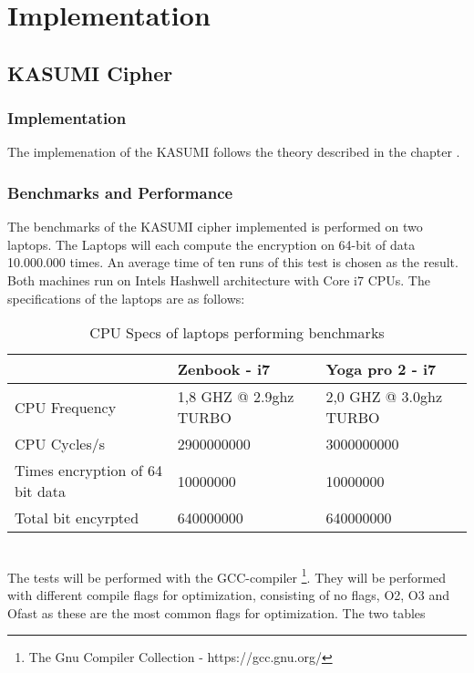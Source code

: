 \chapter{Implementation}
\section{KASUMI Cipher}
\subsection{Implementation}
The implemenation of the KASUMI follows the theory described in the
chapter .

\subsection{Benchmarks and Performance}
The benchmarks of the KASUMI cipher implemented is performed on two
laptops. The Laptops will each compute the encryption on 64-bit of
data 10.000.000 times. An average time of ten runs of this test is
chosen as the result. Both machines run on Intels Hashwell
architecture with Core i7 CPUs. The specifications of the laptops are as follows:
\begin{table}[h!]
    \begin{tabular}{l|l|l}
                                    & Zenbook - i7           & Yoga
                                                               pro 2 -
      i7\\ \hline
    CPU Frequency                   & 1,8 GHZ @ 2.9ghz TURBO & 2,0 GHZ @ 3.0ghz TURBO \\ \hline
    CPU Cycles/s                    & 2900000000             & 3000000000             \\ \hline
    Times encryption of 64 bit data & 10000000               & 10000000               \\ \hline
    Total bit encyrpted             & 640000000              & 640000000              \\
    \end{tabular}
    \caption{CPU Specs of laptops performing benchmarks}
    \label{tab:specs}
\end{table}\\
The tests will be performed with the
GCC-compiler \footnote{The Gnu Compiler Collection -
  https://gcc.gnu.org/}. They will be performed with different compile
flags for optimization, consisting of no flags, O2, O3 and Ofast as
these are the most common flags for optimization. The two tables
